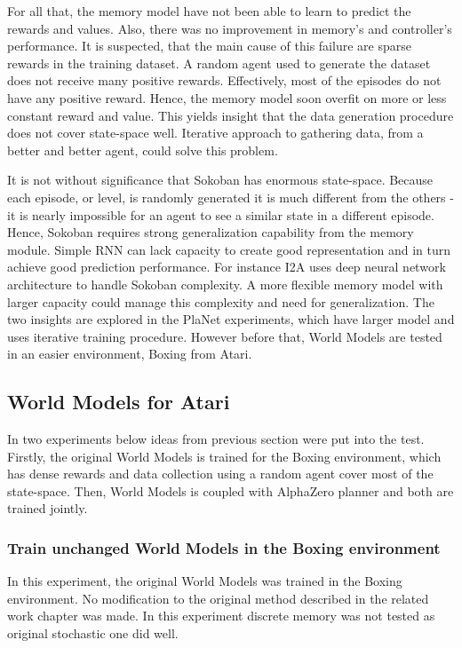 For all that, the memory model have not been able to learn to predict the rewards and values. Also, there was no improvement in memory's and controller’s performance. It is suspected, that the main cause of this failure are sparse rewards in the training dataset. A random agent used to generate the dataset does not receive many positive rewards. Effectively, most of the episodes do not have any positive reward. Hence, the memory model soon overfit on more or less constant reward and value. 
This yields insight that the data generation procedure does not cover state-space well. Iterative approach to gathering data, from a better and better agent, could solve this problem.

It is not without significance that Sokoban has enormous state-space. Because each episode, or level, is randomly generated it is much different from the others - it is nearly impossible for an agent to see a similar state in a different episode. Hence, Sokoban requires strong generalization capability from the memory module. Simple RNN can lack capacity to create good representation and in turn achieve good prediction performance. For instance I2A\cite{Algo.I2A} uses deep neural network architecture to handle Sokoban complexity. A more flexible memory model with larger capacity could manage this complexity and need for generalization. The two insights are explored in the PlaNet experiments, which have larger model and uses iterative training procedure. However before that, World Models are tested in an easier environment, Boxing from Atari.

\subsection{World Models for Atari}

In two experiments below ideas from previous section were put into the test. Firstly, the original World Models is trained for the Boxing environment, which has dense rewards and data collection using a random agent cover most of the state-space. Then, World Models is coupled with AlphaZero planner and both are trained jointly.

\subsubsection{Train unchanged World Models in the Boxing environment}

In this experiment, the original World Models was trained in the Boxing environment. No modification to the original method described in the related work chapter was made. In this experiment discrete memory was not tested as original stochastic one did well.

